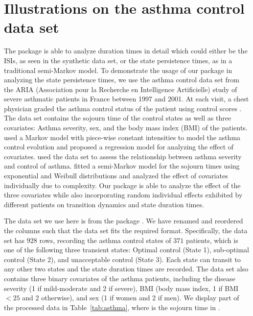 \section{Illustrations on the asthma control data set}\label{sec:asthma}
The  package is able to analyze duration times in detail which could either be the ISIs, as seen in the synthetic  data set, or the state persistence times, as in a traditional semi-Markov model. 
To demonstrate the usage of our package in analyzing the state persistence times, we use the asthma control data set from the ARIA (Association pour la Recherche en Intelligence Artificielle) study of  severe asthmatic patients \citep{combescure2003assessment} in France between 1997 and 2001. 
At each visit, a chest physician graded the asthma control status of the patient using control scores \citep{juniper1999development}.  
The data set contains the sojourn time of the control states as well as three  covariates: Asthma severity, sex, and the body mass index (BMI) of the patients. 
\citet{saint2003analysis} used a Markov model with piece-wise constant intensities to model the asthma control evolution and proposed a regression model for analyzing the effect of covariates.
\citet{combescure2003assessment} used the data set to assess the relationship between asthma severity and control of asthma.
\citet{listwon2015semimarkov} fitted a semi-Markov model for the sojourn times using exponential and Weibull distributions and analyzed the effect of covariates individually due to complexity. 
Our  package is able to analyze the effect of the three covariates while also incorporating random individual effects exhibited by different patients on transition dynamics and state duration times. 

The  data set we use here is from the  package \citep{listwon2015semimarkov}.
We have renamed and reordered the columns such that the data set fits the required format.
Specifically, the data set has $928$ rows, recording the asthma control states of $371$ patients, which is one of the following three transient states:  Optimal control (State 1), sub-optimal control (State 2), and unacceptable control (State 3). 
Each state can transit to any other two states and the state duration times are recorded. 
The data set also contains three binary covariates of the asthma patients, including the disease severity (1 if mild-moderate and 2 if severe), BMI (body mass index, 1 if BMI $<25$ and 2 otherwise), and sex (1 if women and 2 if men). 
We display part of the processed data in Table~\ref{tab:asthma}, where  is the sojourn time in .



